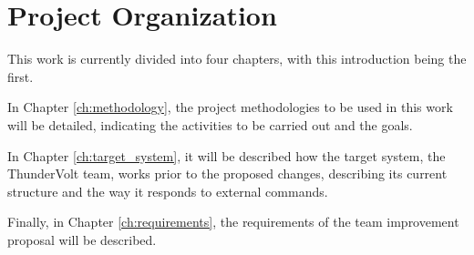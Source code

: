 \section{Project Organization}

This work is currently divided into four chapters, with this introduction being the first.

In Chapter \ref{ch:methodology}, the project methodologies to be used in this work will be detailed, indicating the activities to be carried out and the goals.

In Chapter \ref{ch:target_system}, it will be described how the target system, the ThunderVolt team, works prior to the proposed changes, describing its current structure and the way it responds to external commands.

Finally, in Chapter \ref{ch:requirements}, the requirements of the team improvement proposal will be described.